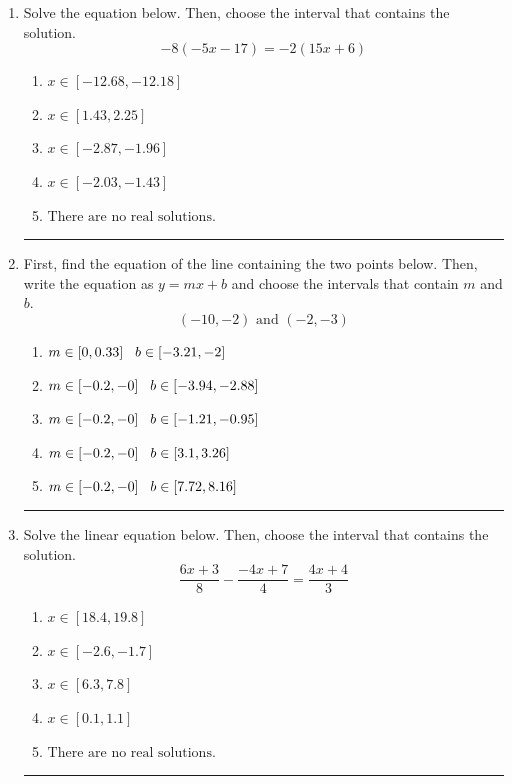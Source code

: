 \documentclass[14pt]{extbook}
\newcommand{\litem}[1]{\item#1\hspace*{-1cm}\rule{\textwidth}{0.4pt}}
\begin{document}
\begin{enumerate}
{\begin{enumerate}[label=\Alph*.]
\end{enumerate} }
\litem{
Solve the equation below. Then, choose the interval that contains the solution.\[ -8(-5x -17) = -2(15x + 6) \]\begin{enumerate}[label=\Alph*.]
\item \( x \in [-12.68, -12.18] \)
\item \( x \in [1.43, 2.25] \)
\item \( x \in [-2.87, -1.96] \)
\item \( x \in [-2.03, -1.43] \)
\item \( \text{There are no real solutions.} \)

\end{enumerate} }
\litem{
First, find the equation of the line containing the two points below. Then, write the equation as $ y=mx+b $ and choose the intervals that contain $m$ and $b$.\[ (-10, -2) \text{ and } (-2, -3) \]\begin{enumerate}[label=\Alph*.]
\item \( m \in [0, 0.33] \hspace*{3mm} b \in [-3.21, -2] \)
\item \( m \in [-0.2, -0] \hspace*{3mm} b \in [-3.94, -2.88] \)
\item \( m \in [-0.2, -0] \hspace*{3mm} b \in [-1.21, -0.95] \)
\item \( m \in [-0.2, -0] \hspace*{3mm} b \in [3.1, 3.26] \)
\item \( m \in [-0.2, -0] \hspace*{3mm} b \in [7.72, 8.16] \)

\end{enumerate} }
\litem{
Solve the linear equation below. Then, choose the interval that contains the solution.\[ \frac{6x + 3}{8} - \frac{-4x + 7}{4} = \frac{4x + 4}{3} \]\begin{enumerate}[label=\Alph*.]
\item \( x \in [18.4, 19.8] \)
\item \( x \in [-2.6, -1.7] \)
\item \( x \in [6.3, 7.8] \)
\item \( x \in [0.1, 1.1] \)
\item \( \text{There are no real solutions.} \)


\end{enumerate}}
\end{enumerate}
\end{document}
